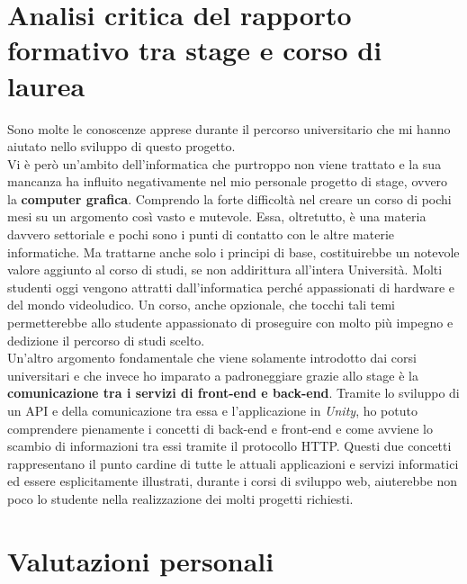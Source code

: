 \section{Analisi critica del rapporto formativo tra stage e corso di laurea}

Sono molte le conoscenze apprese durante il percorso universitario che mi hanno aiutato nello sviluppo di questo progetto. \\
Vi è però un'ambito dell'informatica che purtroppo non viene trattato e la sua mancanza ha influito negativamente nel mio personale progetto di stage, ovvero la \textbf{computer grafica}. Comprendo la forte difficoltà nel creare un corso di pochi mesi su un argomento così vasto e mutevole. Essa, oltretutto, è una materia davvero settoriale e pochi sono i punti di contatto con le altre materie informatiche. Ma trattarne anche solo i principi di base, costituirebbe un notevole valore aggiunto al corso di studi, se non addirittura all'intera Università. Molti studenti oggi vengono attratti dall'informatica perché appassionati di hardware e del mondo videoludico. Un corso, anche opzionale, che tocchi tali temi permetterebbe allo studente appassionato di proseguire con molto più impegno e dedizione il percorso di studi scelto. \\
Un'altro argomento fondamentale che viene solamente introdotto dai corsi universitari e che invece ho imparato a padroneggiare grazie allo stage è la \textbf{comunicazione tra i servizi di front-end e back-end}. Tramite lo sviluppo di un API e della comunicazione tra essa e l'applicazione in \textit{Unity}, ho potuto comprendere pienamente i concetti di back-end e front-end e come avviene lo scambio di informazioni tra essi tramite il protocollo HTTP. Questi due concetti rappresentano il punto cardine di tutte le attuali applicazioni e servizi informatici ed essere esplicitamente illustrati, durante i corsi di sviluppo web, aiuterebbe non poco lo studente nella realizzazione dei molti progetti richiesti. 

\section{Valutazioni personali}

